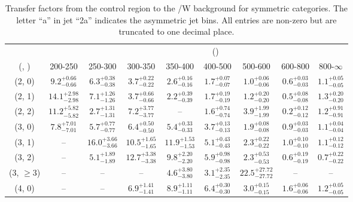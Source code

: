 \begin{table}[h!]
\tiny
\centering
\caption{Transfer factors from the \mmj control region to the \ttbar/W background for symmetric categories. The letter ``a'' in jet \eg ``2a''  indicates the asymmetric jet bins. All entries are non-zero but are truncated to one decimal place.\label{tab:tf_ttw_mumu_sym}}
\begin{tabular}
{ccccccccc}
	\hline\hline
&	& \multicolumn{8}{c}{\scalht (\gev)} \\ 
	 (\njet,  \nb) & 200-250 & 250-300 & 300-350 & 350-400 & 400-500 & 500-600 & 600-800 & 800-$\infty$ \\ [0.8ex] 
\hline
	(2, 0) & $9.2^{+ 0.66 }_{- 0.66 }$ & $6.3^{+ 0.38 }_{- 0.38 }$ & $3.7^{+ 0.22 }_{- 0.22 }$ & $2.6^{+ 0.16 }_{- 0.16 }$ & $1.7^{+ 0.07 }_{- 0.07 }$ & $1.0^{+ 0.06 }_{- 0.06 }$ & $0.6^{+ 0.03 }_{- 0.03 }$ & $1.1^{+ 0.05 }_{- 0.05 }$ \\[0.5ex] 
	(2, 1) & $14.1^{+ 2.98 }_{- 2.98 }$ & $7.1^{+ 1.26 }_{- 1.26 }$ & $3.7^{+ 0.66 }_{- 0.66 }$ & $2.2^{+ 0.39 }_{- 0.39 }$ & $1.7^{+ 0.19 }_{- 0.19 }$ & $1.2^{+ 0.20 }_{- 0.20 }$ & $0.5^{+ 0.08 }_{- 0.08 }$ & $1.3^{+ 0.20 }_{- 0.20 }$ \\[0.5ex] 
	(2, 2) & $11.2^{+ 5.82 }_{- 5.82 }$ & $2.7^{+ 1.31 }_{- 1.31 }$ & $7.2^{+ 3.77 }_{- 3.77 }$ & -- & $1.6^{+ 0.74 }_{- 0.74 }$ & $3.9^{+ 1.99 }_{- 1.99 }$ & $0.2^{+ 0.12 }_{- 0.12 }$ & $1.2^{+ 0.91 }_{- 0.91 }$ \\[0.5ex] 
	(3, 0) & $7.8^{+ 7.01 }_{- 7.01 }$ & $5.7^{+ 0.77 }_{- 0.77 }$ & $6.4^{+ 0.50 }_{- 0.50 }$ & $5.4^{+ 0.33 }_{- 0.33 }$ & $3.7^{+ 0.13 }_{- 0.13 }$ & $1.9^{+ 0.08 }_{- 0.08 }$ & $0.9^{+ 0.03 }_{- 0.03 }$ & $1.1^{+ 0.04 }_{- 0.04 }$ \\[0.5ex] 
	(3, 1) & -- & $16.0^{+ 3.66 }_{- 3.66 }$ & $10.5^{+ 1.65 }_{- 1.65 }$ & $11.9^{+ 1.53 }_{- 1.53 }$ & $5.1^{+ 0.43 }_{- 0.43 }$ & $2.3^{+ 0.22 }_{- 0.22 }$ & $1.0^{+ 0.10 }_{- 0.10 }$ & $1.1^{+ 0.12 }_{- 0.12 }$ \\[0.5ex] 
	(3, 2) & -- & $5.1^{+ 1.89 }_{- 1.89 }$ & $12.7^{+ 3.38 }_{- 3.38 }$ & $9.8^{+ 2.20 }_{- 2.20 }$ & $5.9^{+ 0.98 }_{- 0.98 }$ & $2.3^{+ 0.53 }_{- 0.53 }$ & $0.6^{+ 0.19 }_{- 0.19 }$ & $0.7^{+ 0.22 }_{- 0.22 }$ \\[0.5ex] 
	(3, $\ge3$) & -- & -- & -- & $4.6^{+ 3.80 }_{- 3.80 }$ & $3.1^{+ 2.35 }_{- 2.35 }$ & $22.5^{+ 27.72 }_{- 27.72 }$ & -- & -- \\[0.5ex] 
	(4, 0) & -- & -- & $6.9^{+ 1.41 }_{- 1.41 }$ & $8.9^{+ 1.11 }_{- 1.11 }$ & $6.4^{+ 0.30 }_{- 0.30 }$ & $3.0^{+ 0.15 }_{- 0.15 }$ & $1.6^{+ 0.06 }_{- 0.06 }$ & $1.2^{+ 0.05 }_{- 0.05 }$ \\[0.5ex] 

\end{tabular}
\end{table}
